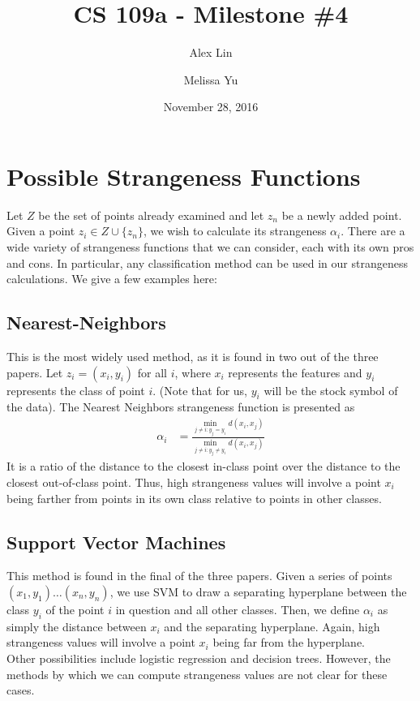\documentclass[11pt, margin=1in]{article}
\begin{document}
\title{CS 109a - Milestone \#4}
\author{Alex Lin \and Melissa Yu}
\date{November 28, 2016}
\maketitle

\section{Possible Strangeness Functions}

Let $Z$ be the set of points already examined and let $z_n$ be a newly added point.  Given a point $z_i \in Z \cup \{z_n\}$, we wish to calculate its strangeness $\alpha_i$.  There are a wide variety of strangeness functions that we can consider, each with its own pros and cons.  In particular, any classification method can be used in our strangeness calculations.  We give a few examples here:

\subsection{Nearest-Neighbors}
This is the most widely used method, as it is found in two out of the three papers.  Let $z_i = (x_i, y_i)$ for all $i$, where $x_i$ represents the features and $y_i$ represents the class of point $i$.  (Note that for us, $y_i$ will be the stock symbol of the data).  The Nearest Neighbors strangeness function is presented as 
\begin{align*}
\alpha_i &= \frac{\min_{j \neq i: y_j = y_i} d(x_i, x_j)}{\min_{j \neq i: y_j \neq y_i} d(x_i, x_j)}
\end{align*}  
It is a ratio of the distance to the closest in-class point over the distance to the closest out-of-class point.  Thus, high strangeness values will involve a point $x_i$ being farther from points in its own class relative to points in other classes.

\subsection{Support Vector Machines}  
This method is found in the final of the three papers.  Given a series of points $(x_1, y_1) \ldots (x_n, y_n)$, we use SVM to draw a separating hyperplane between the class $y_i$ of the point $i$ in question and all other classes.  Then, we define $\alpha_i$ as simply the distance between $x_i$ and the separating hyperplane.  Again, high strangeness values will involve a point $x_i$ being far from the hyperplane.   
\\

Other possibilities include logistic regression and decision trees.  However, the methods by which we can compute strangeness values are not clear for these cases.    
 
\end{document}
